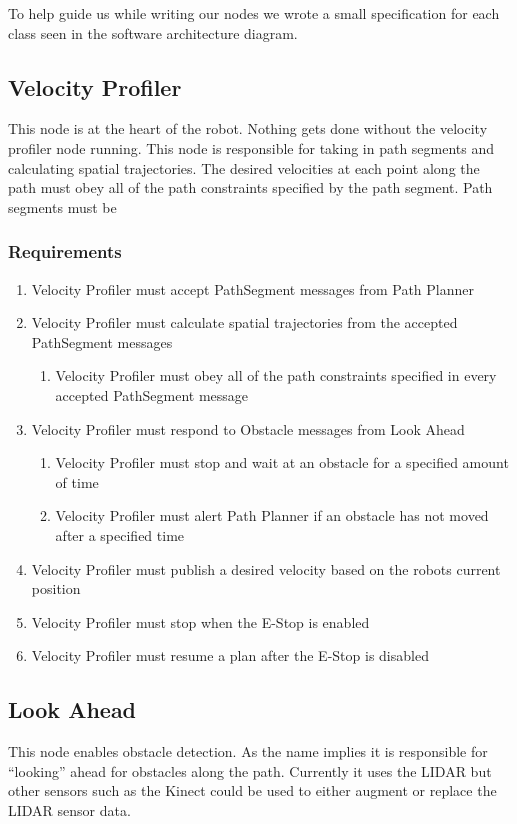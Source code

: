 To help guide us while writing our nodes we wrote a small
specification for each class seen in the software architecture diagram.

\subsection{Velocity Profiler}
This node is at the heart of the robot.  Nothing gets done without the
velocity profiler node running.  This node is responsible for taking
in path segments and calculating spatial trajectories.  The desired
velocities at each point along the path must obey all of the path
constraints specified by the path segment.  Path segments must be

\subsubsection{Requirements}
\begin{enumerate}
  \item Velocity Profiler must accept PathSegment messages from
    Path Planner
    \item Velocity Profiler must calculate spatial trajectories from
      the accepted PathSegment messages
      \begin{enumerate}
        \item Velocity Profiler must obey all of the path constraints
          specified in every accepted PathSegment message
         \end {enumerate}
\item Velocity Profiler must respond to Obstacle messages from Look
  Ahead
  \begin{enumerate}
    \item Velocity Profiler must stop and wait at an obstacle for a
      specified amount of time
      \item Velocity Profiler must alert Path Planner if an obstacle
        has not moved after a specified time
      \end{enumerate}
      \item Velocity Profiler must publish a desired velocity based on
        the robots current position
      \item Velocity Profiler must stop when the E-Stop is enabled
        \item Velocity Profiler must resume a plan after the E-Stop is
  disabled
  \end{enumerate}
      
  \subsection{Look Ahead}
  This node enables obstacle detection. As the name implies it is
  responsible for ``looking'' ahead for obstacles along the path.
  Currently it uses the LIDAR but other sensors such as the Kinect
  could be used to either augment or replace the LIDAR sensor data.

